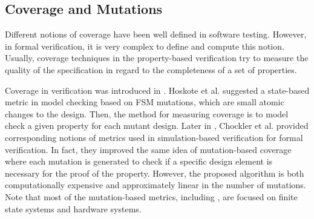 \subsection{Coverage and Mutations}

Different notions of coverage have been well defined in software testing. However, in formal verification, it is very complex to define and compute this notion.
Usually, coverage techniques in the property-based verification try to measure the quality of the specification in regard to the completeness of a set of properties.

Coverage in verification was introduced in \cite{hoskote1999coverage, katz1999have}. Hoskote et al. \cite{hoskote1999coverage} suggested a state-based metric in model checking based on FSM mutations, which are small atomic changes to the design. Then, the method for measuring coverage is to model check a given property for each mutant design.
Later in \cite{chockler_coverage_2003}, Chockler et al. provided corresponding notions of metrics used in simulation-based verification for formal verification. In fact, they improved the same idea of mutation-based coverage where each mutation is generated to check if a specific
design element is necessary for the proof of the property.
 However, the proposed algorithm is both computationally expensive and approximately linear
 in the number of mutations. Note that most of the mutation-based metrics, including \cite{kupferman_theory_2008, chockler2001practical}, are focused on finite state systems and hardware systems.

